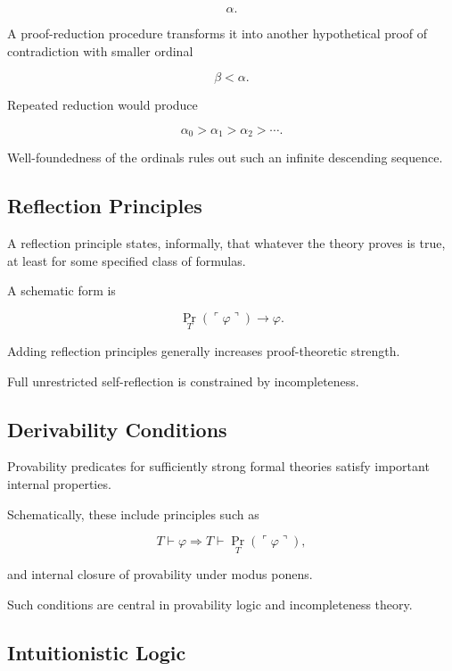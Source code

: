 \[
\alpha.
\]

A proof-reduction procedure transforms it into another hypothetical proof
of contradiction with smaller ordinal

\[
\beta<\alpha.
\]

Repeated reduction would produce

\[
\alpha_0
>
\alpha_1
>
\alpha_2
>
\cdots.
\]

Well-foundedness of the ordinals rules out such an infinite descending
sequence.

\subsection{Reflection Principles}
\label{subsec:reflection-principles}

A reflection principle states, informally, that whatever the theory proves
is true, at least for some specified class of formulas.

A schematic form is

\[
\boxed{
\operatorname{Pr}_T
(
\ulcorner\varphi\urcorner
)
\rightarrow
\varphi.
}
\]

Adding reflection principles generally increases proof-theoretic strength.

Full unrestricted self-reflection is constrained by incompleteness.

\subsection{Derivability Conditions}
\label{subsec:derivability-conditions}

Provability predicates for sufficiently strong formal theories satisfy
important internal properties.

Schematically, these include principles such as

\[
\boxed{
T\vdash\varphi
\Longrightarrow
T\vdash
\operatorname{Pr}_T(\ulcorner\varphi\urcorner),
}
\]

and internal closure of provability under modus ponens.

Such conditions are central in provability logic and incompleteness theory.

\subsection{Intuitionistic Logic}
\label{subsec:proof-theory-intuitionistic-logic}

